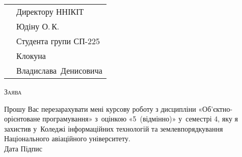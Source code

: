\documentclass[a4paper,oneside,DIV=9,12pt]{scrartcl}
\begin{document}
	\pagestyle{empty}
%		
	
	\begin{tabular}{p{228pt}l}
		& Директору ННІКІТ\\
		& Юдіну О.\,К.\\
		& Студента групи СП-225\\
		& Клокуна\\
		& Владислава~Денисовича\\
	\end{tabular}
	
	\begin{center}
	\textsc{Заява}
	\end{center}
	
	Прошу Вас перезарахувати мені курсову роботу з дисципліни «Об'\-єкт\-но-орі\-єн\-то\-ва\-не програмування» з~оцінкою «5~(відмінно)» у~семестрі 4, яку я захистив у~Коледжі інформаційних технологій та землевпорядкування Національного авіаційного університету.\\[\baselineskip]
	
	\noindent Дата \hspace{\fill} Підпис
	
\end{document}
